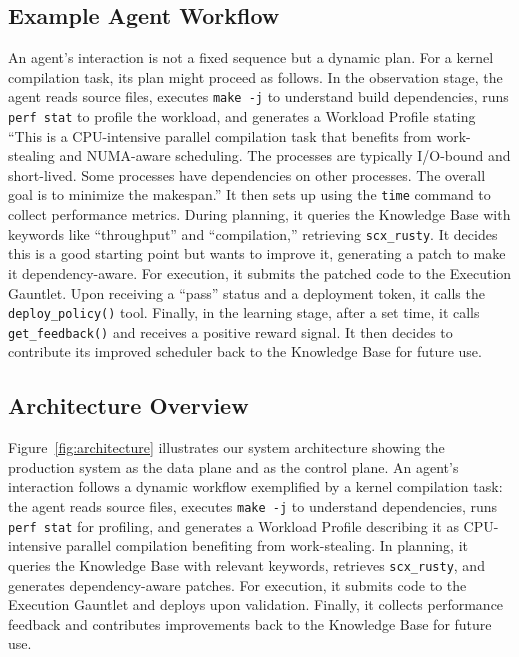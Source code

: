 \subsection{Example Agent Workflow}

An agent's interaction is not a fixed sequence but a dynamic plan. For a kernel compilation task, its plan might proceed as follows. In the observation stage, the agent reads source files, executes \texttt{make -j} to understand build dependencies, runs \texttt{perf stat} to profile the workload, and generates a Workload Profile stating ``This is a CPU-intensive parallel compilation task that benefits from work-stealing and NUMA-aware scheduling. The processes are typically I/O-bound and short-lived. Some processes have dependencies on other processes. The overall goal is to minimize the makespan.'' It then sets up using the \texttt{time} command to collect performance metrics. During planning, it queries the Knowledge Base with keywords like ``throughput'' and ``compilation,'' retrieving \texttt{scx\_rusty}. It decides this is a good starting point but wants to improve it, generating a patch to make it dependency-aware. For execution, it submits the patched code to the Execution Gauntlet. Upon receiving a ``pass'' status and a deployment token, it calls the \texttt{deploy\_policy()} tool. Finally, in the learning stage, after a set time, it calls \texttt{get\_feedback()} and receives a positive reward signal. It then decides to contribute its improved scheduler back to the Knowledge Base for future use.

\subsection{Architecture Overview}

Figure~\ref{fig:architecture} illustrates our system architecture showing the production system as the data plane and \sys as the control plane. An agent's interaction follows a dynamic workflow exemplified by a kernel compilation task: the agent reads source files, executes \texttt{make -j} to understand dependencies, runs \texttt{perf stat} for profiling, and generates a Workload Profile describing it as CPU-intensive parallel compilation benefiting from work-stealing. In planning, it queries the Knowledge Base with relevant keywords, retrieves \texttt{scx\_rusty}, and generates dependency-aware patches. For execution, it submits code to the Execution Gauntlet and deploys upon validation. Finally, it collects performance feedback and contributes improvements back to the Knowledge Base for future use.

